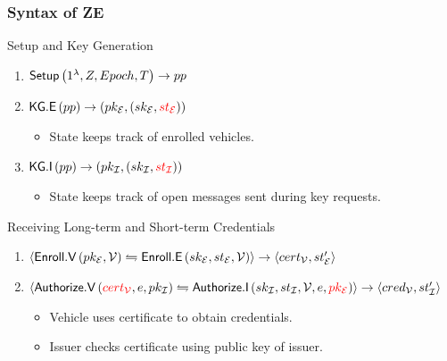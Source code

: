 \documentclass{beamer}
\begin{document}
    \begin{frame}
        \frametitle{Syntax of ZE}
        \begin{block}{Setup and Key Generation}
            \begin{enumerate}
                \item \(\mathsf{Setup}\left(1^{\lambda},Z,Epoch,T\right) \rightarrow
                pp\)
                \item \(\mathsf{KG.E}\left(pp\right) \rightarrow
                \left(pk_{\mathcal E},\left(sk_{\mathcal E},\textcolor{red}{st_{\mathcal E}}\right)\right)\)
                \begin{itemize}
                    \item State keeps track of enrolled vehicles.
                \end{itemize}
                \item \(\mathsf{KG.I}\left(pp\right) \rightarrow
                \left(pk_{\mathcal I},\left(sk_{\mathcal I},\textcolor{red}{st_{\mathcal I}}\right)\right)\)
                \begin{itemize}
                    \item State keeps track of open messages sent during key
                    requests.
                \end{itemize}
            \end{enumerate}
        \end{block}
        \pause
        \begin{block}{Receiving Long-term and Short-term Credentials}
            \begin{enumerate}
                \item \(\left\langle \mathsf{Enroll.V}\left(pk_{\mathcal E},\mathcal V\right)
                \leftrightharpoons
                \mathsf{Enroll.E}\left(sk_{\mathcal E},st_{\mathcal E},\mathcal V\right) \right\rangle \rightarrow
                \left\langle cert_{\mathcal V},st_{\mathcal E}^{\prime} \right\rangle\)
                \item
                \(\left\langle \mathsf{Authorize.V}\left(\textcolor{red}{cert_{\mathcal V}},e,pk_{\mathcal I}\right)
                \leftrightharpoons
                \mathsf{Authorize.I}\left(sk_{\mathcal I},st_{\mathcal I},\mathcal V,e,\textcolor{red}{pk_{\mathcal E}}\right) \right\rangle
                \rightarrow \left\langle cred_{\mathcal V},st_{\mathcal I}^{\prime} \right\rangle\)
                \begin{itemize}
                    \item Vehicle uses certificate to obtain credentials.
                    \item Issuer checks certificate using public key of issuer.
                \end{itemize}
            \end{enumerate}
        \end{block}
    \end{frame}
\end{document}
